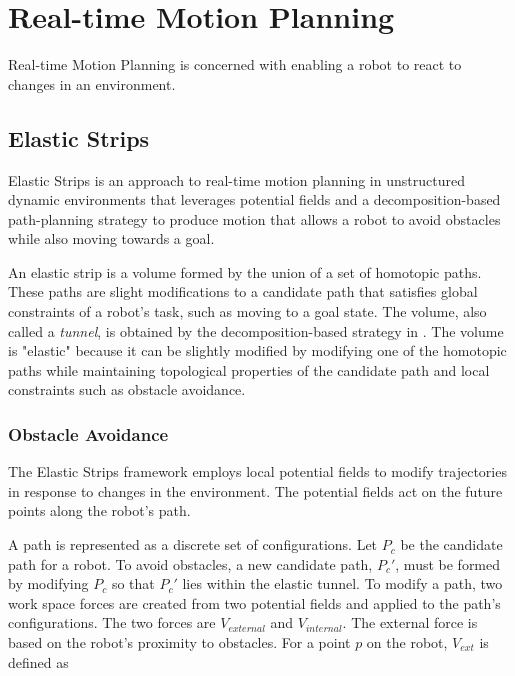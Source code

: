 \documentclass[10pt,conference]{ieeeconf}
\begin{document}


\section{Real-time Motion Planning} \label{sec:real-time}

Real-time Motion Planning is concerned with enabling a robot to react to changes in an environment.

\subsection{Elastic Strips} \label{sec:elastic}

Elastic Strips \cite{brock2002elastic} is an approach to real-time motion planning in unstructured dynamic environments that leverages potential fields and a decomposition-based path-planning strategy \cite{brock2001decomposition} to produce motion that allows a robot to avoid obstacles while also moving towards a goal.

An elastic strip is a volume formed by the union of a set of homotopic paths. These paths are slight modifications to a candidate path that satisfies global constraints of a robot's task, such as moving to a goal state. The volume, also called a \emph{tunnel}, is obtained by the decomposition-based strategy in \cite{brock2001decomposition}. The volume is "elastic" because it can be slightly modified by modifying one of the homotopic paths while maintaining topological properties of the candidate path and local constraints such as obstacle avoidance. 


\subsubsection{Obstacle Avoidance}

The Elastic Strips framework employs local potential fields to modify trajectories in response to changes in the environment. The potential fields act on the future points along the robot's path.

A path is represented as a discrete set of configurations. Let $P_c$ be the candidate path for a robot. To avoid obstacles, a new candidate path, $P_c'$, must be formed by modifying $P_c$ so that $P_c'$ lies within the elastic tunnel. To modify a path, two work space forces are created from two potential fields and applied to the path's configurations. The two forces are $V_{external}$ and $V_{internal}$. The external force is based on the robot's proximity to obstacles. For a point $p$ on the robot, $V_{ext}$ is defined as
\end{document}
